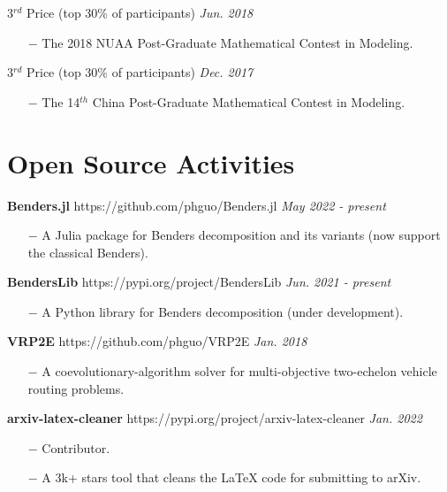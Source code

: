 \documentclass[margin]{res}
\begin{document}
\begin{resume}
{3\(^{rd}\) Price} (top 30\% of participants)  \hfill {\it Jun. 2018} 
\begin{itemize} \itemsep -2pt  %
\item[\(-\)] The 2018 NUAA Post-Graduate Mathematical Contest in Modeling.
\end{itemize}
\vspace{-.8em}

{3\(^{rd}\) Price} (top 30\% of participants)  \hfill {\it Dec. 2017}
\begin{itemize} \itemsep -2pt  %
\item[\(-\)] The 14\(^{th}\) China Post-Graduate Mathematical Contest in Modeling.
\end{itemize}


\vspace{-.8em}
\section{\sc Open Source Activities} 


\textbf{Benders.jl } https://github.com/phguo/Benders.jl \hfill {\it May 2022 - present}
\begin{itemize} \itemsep -2pt
\item[\(-\)] A Julia package for Benders decomposition and its variants (now support the classical Benders).
\end{itemize}
\vspace{-.8em}

\textbf{BendersLib } https://pypi.org/project/BendersLib \hfill {\it Jun. 2021 - present}
\begin{itemize} \itemsep -2pt
\item[\(-\)] A Python library for Benders decomposition (under development).
\end{itemize}
\vspace{-.8em}

\textbf{VRP2E } https://github.com/phguo/VRP2E \hfill {\it Jan. 2018}
\begin{itemize} \itemsep -2pt
\item[\(-\)] A coevolutionary-algorithm solver for multi-objective two-echelon vehicle routing problems.
\end{itemize}
\vspace{-.8em}

\textbf{arxiv-latex-cleaner } https://pypi.org/project/arxiv-latex-cleaner \hfill {\it Jan. 2022}
\begin{itemize} \itemsep -2pt
\item[\(-\)] Contributor.
\item[\(-\)] A 3k+ stars tool that cleans the LaTeX code for submitting to arXiv.
\end{itemize}



\end{resume}
\end{document}
